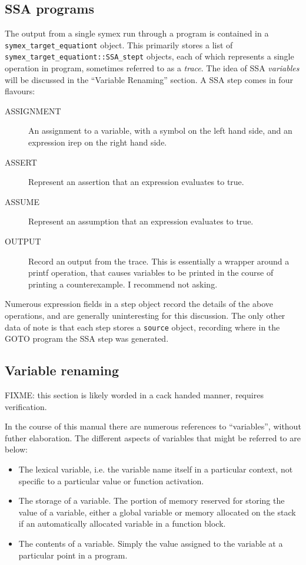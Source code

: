 \documentclass{article}
\begin{document}
\subsection{SSA programs}

The output from a single symex run through a program is contained in a
\texttt{symex\_target\_equationt} object. This primarily stores a list of
\texttt{symex\_target\_equationt::SSA\_stept} objects, each of which represents
a single operation in program, sometimes referred to as a \textit{trace}.
The idea of SSA \textit{variables} will be discussed in the ``Variable
Renaming'' section. A SSA step comes in four flavours:

\begin{description}
\item[ASSIGNMENT] An assignment to a variable, with a symbol on the left hand
side, and an expression irep on the right hand side.
\item[ASSERT] Represent an assertion that an expression evaluates to true.
\item[ASSUME] Represent an assumption that an expression evaluates to true.
\item[OUTPUT] Record an output from the trace. This is essentially a wrapper
around a printf operation, that causes variables to be printed in the
course of printing a counterexample. I recommend not asking.
\end{description}

Numerous expression fields in a step object record the details of the above
operations, and are generally uninteresting for this discussion. The only
other data of note is that each step stores a \texttt{source} object, recording
where in the GOTO program the SSA step was generated.

\subsection{Variable renaming}

FIXME: this section is likely worded in a cack handed manner, requires
verification.

In the course of this manual there are numerous references to ``variables'',
without futher elaboration. The different aspects of variables that might be
referred to are below:

\begin{itemize}
\item The lexical variable, i.e. the variable name itself in a particular
context, not specific to a particular value or function activation.
\item The storage of a variable. The portion of memory reserved for storing
the value of a variable, either a global variable or memory allocated on the
stack if an automatically allocated variable in a function block.
\item The contents of a variable. Simply the value assigned to the variable
at a particular point in a program.
\end{itemize}
\end{document}

